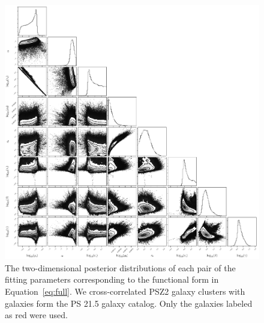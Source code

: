 \documentclass[iop, apjl, twocolappendix, numberedappendix]{emulateapj}
\begin{document}
\begin{figure}
    \includegraphics[width= \textwidth]{cornerred.pdf}
\caption{The two-dimensional posterior distributions of each pair of
the fitting parameters corresponding to the functional
form in Equation~\ref{eq:full}. We cross-correlated PSZ2 galaxy clusters with
galaxies form the PS 21.5 galaxy catalog. Only the galaxies labeled
as red were used.}
   \label{fig:cornerred} 
\end{figure}
\end{document}
